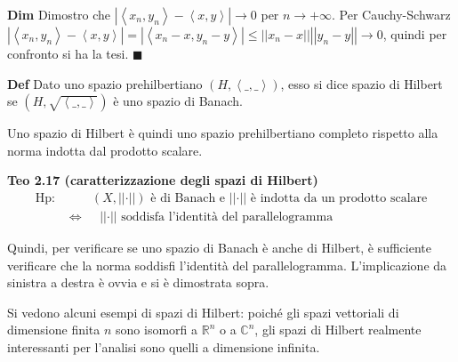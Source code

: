 \documentclass{article}
\begin{document}
\textbf{Dim} Dimostro che $\left\vert \left\langle x_{n},y_{n}\right\rangle
-\left\langle x,y\right\rangle \right\vert \rightarrow 0$ per $n\rightarrow
+\infty $. Per Cauchy-Schwarz $\left\vert \left\langle
x_{n},y_{n}\right\rangle -\left\langle x,y\right\rangle \right\vert
=\left\vert \left\langle x_{n}-x,y_{n}-y\right\rangle \right\vert \leq
\left\vert \left\vert x_{n}-x\right\vert \right\vert \left\vert \left\vert
y_{n}-y\right\vert \right\vert \rightarrow 0$, quindi per confronto si ha la
tesi. $\blacksquare $

\textbf{Def} Dato uno spazio prehilbertiano $\left( H,\left\langle
\_,\_\right\rangle \right) $, esso si dice spazio di Hilbert se $\left( H,%
\sqrt{\left\langle \_,\_\right\rangle }\right) $ \`{e} uno spazio di Banach.

Uno spazio di Hilbert \`{e} quindi uno spazio prehilbertiano completo
rispetto alla norma indotta dal prodotto scalare.

\textbf{Teo 2.17 (caratterizzazione degli spazi di Hilbert)}%
\begin{eqnarray*}
\text{Hp}\text{: } &&\left( X,\left\vert \left\vert \cdot \right\vert
\right\vert \right) \text{ \`{e} di Banach e }\left\vert \left\vert \cdot
\right\vert \right\vert \text{ \`{e} indotta da un prodotto scalare} \\
\text{ } &\Longleftrightarrow &\text{ }\left\vert \left\vert \cdot
\right\vert \right\vert \text{ soddisfa l'identit\`{a} del parallelogramma}
\end{eqnarray*}

Quindi, per verificare se uno spazio di Banach \`{e} anche di Hilbert, \`{e}
sufficiente verificare che la norma soddisfi l'identit\`{a} del
parallelogramma. L'implicazione da sinistra a destra \`{e} ovvia e si \`{e}
dimostrata sopra.

Si vedono alcuni esempi di spazi di Hilbert: poich\'{e} gli spazi vettoriali
di dimensione finita $n$ sono isomorfi a $%
\mathbb{R}
^{n}$ o a $%
\mathbb{C}
^{n}$, gli spazi di Hilbert realmente interessanti per l'analisi sono quelli
a dimensione infinita.
\end{document}
